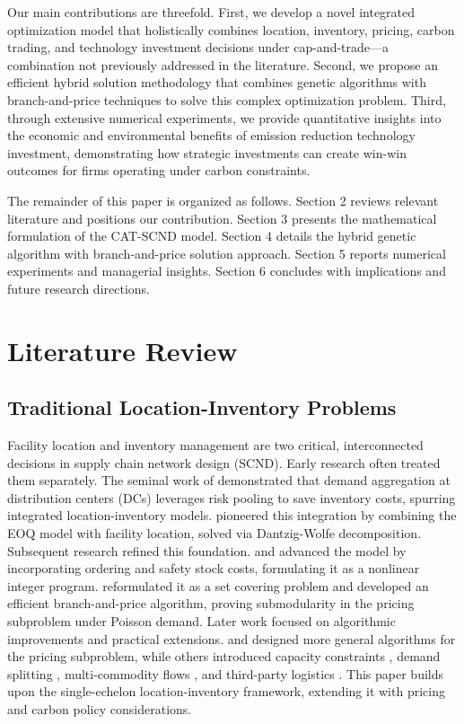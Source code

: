 \documentclass[]{article}
\theoremstyle{plain}%
\theoremstyle{definition}
\theoremstyle{remark}
\theoremstyle{plain}%
\begin{document}
Our main contributions are threefold. First, we develop a novel integrated optimization model that holistically combines location, inventory, pricing, carbon trading, and technology investment decisions under cap-and-trade—a combination not previously addressed in the literature. Second, we propose an efficient hybrid solution methodology that combines genetic algorithms with branch-and-price techniques to solve this complex optimization problem. Third, through extensive numerical experiments, we provide quantitative insights into the economic and environmental benefits of emission reduction technology investment, demonstrating how strategic investments can create win-win outcomes for firms operating under carbon constraints.

The remainder of this paper is organized as follows. Section 2 reviews relevant literature and positions our contribution. Section 3 presents the mathematical formulation of the CAT-SCND model. Section 4 details the hybrid genetic algorithm with branch-and-price solution approach. Section 5 reports numerical experiments and managerial insights. Section 6 concludes with implications and future research directions.

\section{Literature Review}

\subsection{Traditional Location-Inventory Problems}
Facility location and inventory management are two critical, interconnected decisions in supply chain network design (SCND). Early research often treated them separately. The seminal work of \cite{eppen1979effects} demonstrated that demand aggregation at distribution centers (DCs) leverages risk pooling to save inventory costs, spurring integrated location-inventory models. \cite{barahona1998plant} pioneered this integration by combining the EOQ model with facility location, solved via Dantzig-Wolfe decomposition. Subsequent research refined this foundation. \cite{daskin2002inventory} and \cite{shen2003joint} advanced the model by incorporating ordering and safety stock costs, formulating it as a nonlinear integer program. \cite{shen2003joint} reformulated it as a set covering problem and developed an efficient branch-and-price algorithm, proving submodularity in the pricing subproblem under Poisson demand. Later work focused on algorithmic improvements and practical extensions. \cite{shu2005stochastic} and \cite{shu2011market} designed more general algorithms for the pricing subproblem, while others introduced capacity constraints \cite{ozsen2008capacitated}, demand splitting \cite{ozsen2009facility}, multi-commodity flows \cite{wu2014computational}, and third-party logistics \cite{wang2022joint}. This paper builds upon the single-echelon location-inventory framework, extending it with pricing and carbon policy considerations.
\end{document}
